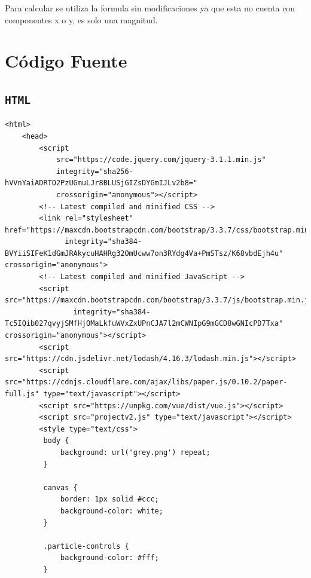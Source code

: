 \documentclass[11pt]{article}
\begin{document}
Para calcular se utiliza la formula sin modificaciones ya que esta no
cuenta con componentes x o y, es solo una magnitud.


\section{Código Fuente}
\label{sec-8}
\subsection{\texttt{HTML}}
\label{sec-8-1}
\begin{verbatim}
<html>
    <head>
        <script
            src="https://code.jquery.com/jquery-3.1.1.min.js"
            integrity="sha256-hVVnYaiADRTO2PzUGmuLJr8BLUSjGIZsDYGmIJLv2b8="
            crossorigin="anonymous"></script>
        <!-- Latest compiled and minified CSS -->
        <link rel="stylesheet" href="https://maxcdn.bootstrapcdn.com/bootstrap/3.3.7/css/bootstrap.min.css"
              integrity="sha384-BVYiiSIFeK1dGmJRAkycuHAHRg32OmUcww7on3RYdg4Va+PmSTsz/K68vbdEjh4u" crossorigin="anonymous">
        <!-- Latest compiled and minified JavaScript -->
        <script src="https://maxcdn.bootstrapcdn.com/bootstrap/3.3.7/js/bootstrap.min.js"
                integrity="sha384-Tc5IQib027qvyjSMfHjOMaLkfuWVxZxUPnCJA7l2mCWNIpG9mGCD8wGNIcPD7Txa" crossorigin="anonymous"></script>
        <script src="https://cdn.jsdelivr.net/lodash/4.16.3/lodash.min.js"></script>
        <script src="https://cdnjs.cloudflare.com/ajax/libs/paper.js/0.10.2/paper-full.js" type="text/javascript"></script>
        <script src="https://unpkg.com/vue/dist/vue.js"></script>
        <script src="projectv2.js" type="text/javascript"></script>
        <style type="text/css">
         body {
             background: url('grey.png') repeat;
         }

         canvas {
             border: 1px solid #ccc;
             background-color: white;
         }

         .particle-controls {
             background-color: #fff;
         }


\end{verbatim}
\end{document}

